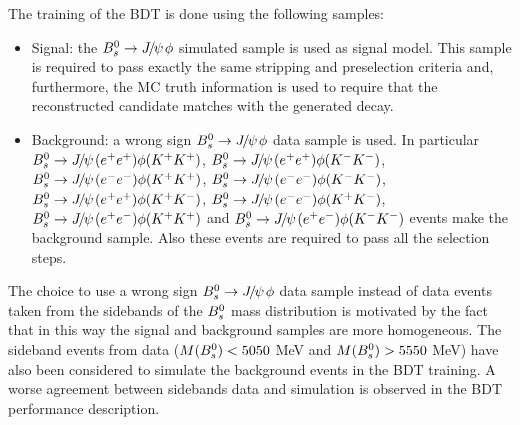   The training of the BDT is done using the following samples:
  \begin{itemize}
   \item Signal: the $\Bs\to\jpsi\phi$ simulated sample is used as signal model. This sample is required to pass exactly the same stripping and preselection criteria and, furthermore, the MC truth information is used to require that the reconstructed candidate matches with the generated decay.
   \item Background: a wrong sign $\Bs\to\jpsi\phi$ data sample is used. In particular $\Bs\to\jpsi(\ep\ep)\phi(\Kp\Kp)$,  $\Bs\to\jpsi(\ep\ep)\phi(\Km\Km)$, $\Bs\to\jpsi(\en\en)\phi(\Kp\Kp)$, $\Bs\to\jpsi(\en\en)\phi(\Km\Km)$, $\Bs\to\jpsi(\ep\ep)\phi(\Kp\Km)$, $\Bs\to\jpsi(\en\en)\phi(\Kp\Km)$,  $\Bs\to\jpsi(\epem)\phi(\Kp\Kp)$ and $\Bs\to\jpsi(\epem)\phi(\Km\Km)$ events make the background sample. Also these events are required to pass all the selection steps.
  \end{itemize}
   
   The choice to use a wrong sign $\Bs\to\jpsi\phi$ data sample instead of data events taken from the sidebands of the $\Bs$ mass distribution is motivated by the fact that in this way the signal and background samples are more homogeneous. The sideband events from data ($M(\Bs)<5050$ MeV and $M(\Bs)>5550$ MeV) have also been considered to simulate the background events in the BDT training. A worse agreement between sidebands data and simulation is observed in the BDT performance description. 

